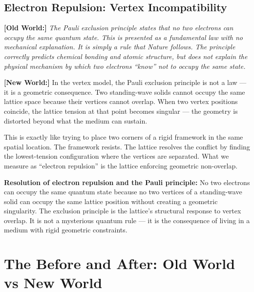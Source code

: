\documentclass[11pt, letterpaper, openany]{book}
\newcommand{\oldworld}[1]{\noindent\textbf{\color{goldseal}[Old World:]}
  \textit{#1}\medskip}
\newcommand{\newworldcmd}[1]{\noindent\textbf{\color{kishblue}[New World:]}
  #1\medskip}
\begin{document}
\section{Electron Repulsion: Vertex Incompatibility}

\oldworld{The Pauli exclusion principle states that no two electrons
can occupy the same quantum state. This is presented as a fundamental
law with no mechanical explanation. It is simply a rule that Nature
follows. The principle correctly predicts chemical bonding and atomic
structure, but does not explain the physical mechanism by which two
electrons ``know'' not to occupy the same state.}

\newworldcmd{In the vertex model, the Pauli exclusion principle is
not a law — it is a geometric consequence. Two standing-wave solids
cannot occupy the same lattice space because their vertices cannot
overlap. When two vertex positions coincide, the lattice tension
at that point becomes singular — the geometry is distorted beyond
what the medium can sustain.

This is exactly like trying to place two corners of a rigid framework
in the same spatial location. The framework resists. The lattice
resolves the conflict by finding the lowest-tension configuration
where the vertices are separated. What we measure as ``electron
repulsion'' is the lattice enforcing geometric non-overlap.}

\begin{resolutionbox}
\textbf{Resolution of electron repulsion and the Pauli principle:}
No two electrons can occupy the same quantum state because no two
vertices of a standing-wave solid can occupy the same lattice position
without creating a geometric singularity. The exclusion principle is
the lattice's structural response to vertex overlap. It is not a
mysterious quantum rule — it is the consequence of living in a
medium with rigid geometric constraints.
\end{resolutionbox}

\clearpage

\chapter{The Before and After: Old World vs New World}
\end{document}
